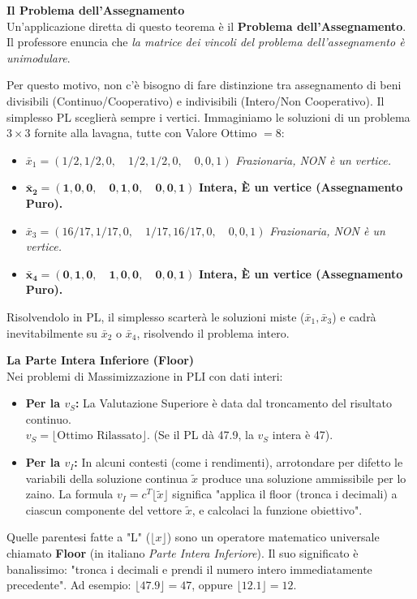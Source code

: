 \documentclass[12pt, a4paper]{article}
\newcommand{\separatore}{\noindent{\color{titlecolor!50}\rule{\textwidth}{0.6pt}}}
\begin{document}
	\vspace{0.3cm}
	\textbf{Il Problema dell'Assegnamento}\\
	Un'applicazione diretta di questo teorema è il \textbf{Problema dell'Assegnamento}. Il professore enuncia che \textit{la matrice dei vincoli del problema dell'assegnamento è unimodulare}. 
	
	Per questo motivo, non c'è bisogno di fare distinzione tra assegnamento di beni divisibili (Continuo/Cooperativo) e indivisibili (Intero/Non Cooperativo). Il simplesso PL sceglierà sempre i vertici.
	Immaginiamo le soluzioni di un problema $3 \times 3$ fornite alla lavagna, tutte con Valore Ottimo $= 8$:
	\begin{itemize}[label=$\circ$, itemsep=2pt, leftmargin=1.5cm]
		\item $\bar{x}_1 = (1/2, 1/2, 0, \quad 1/2, 1/2, 0, \quad 0, 0, 1)$ \hfill \textit{Frazionaria, NON è un vertice.}
		\item $\mathbf{\bar{x}_2 = (1, 0, 0, \quad 0, 1, 0, \quad 0, 0, 1)}$ \hfill \textbf{Intera, È un vertice (Assegnamento Puro).}
		\item $\bar{x}_3 = (16/17, 1/17, 0, \quad 1/17, 16/17, 0, \quad 0, 0, 1)$ \hfill \textit{Frazionaria, NON è un vertice.}
		\item $\mathbf{\bar{x}_4 = (0, 1, 0, \quad 1, 0, 0, \quad 0, 0, 1)}$ \hfill \textbf{Intera, È un vertice (Assegnamento Puro).}
	\end{itemize}
	Risolvendolo in PL, il simplesso scarterà le soluzioni miste ($\bar{x}_1, \bar{x}_3$) e cadrà inevitabilmente su $\bar{x}_2$ o $\bar{x}_4$, risolvendo il problema intero.
	
	\vspace{0.6cm}
	\separatore
	\vspace{0.4cm}
	
	\textbf{La Parte Intera Inferiore (Floor)}\\
	Nei problemi di Massimizzazione in PLI con dati interi:
	\begin{itemize}[label=\textcolor{titlecolor}{\Large\textbullet}, itemsep=2pt, leftmargin=1.5cm]
		\item \textbf{Per la $v_S$:} La Valutazione Superiore è data dal troncamento del risultato continuo. \\
		$v_S = \lfloor \text{Ottimo Rilassato} \rfloor$. (Se il PL dà 47.9, la $v_S$ intera è 47).
		\item \textbf{Per la $v_I$:} In alcuni contesti (come i rendimenti), arrotondare per difetto le variabili della soluzione continua $\tilde{x}$ produce una soluzione ammissibile per lo zaino. La formula $v_I = c^T \lfloor \tilde{x} \rfloor$ significa "applica il floor (tronca i decimali) a ciascun componente del vettore $\tilde{x}$, e calcolaci la funzione obiettivo".
	\end{itemize}
	Quelle parentesi fatte a "L" ($\lfloor x \rfloor$) sono un operatore matematico universale chiamato \textbf{Floor} (in italiano \textit{Parte Intera Inferiore}).
	Il suo significato è banalissimo: "tronca i decimali e prendi il numero intero immediatamente precedente". Ad esempio: $\lfloor 47.9 \rfloor = 47$, oppure $\lfloor 12.1 \rfloor = 12$.
	
\end{document}
